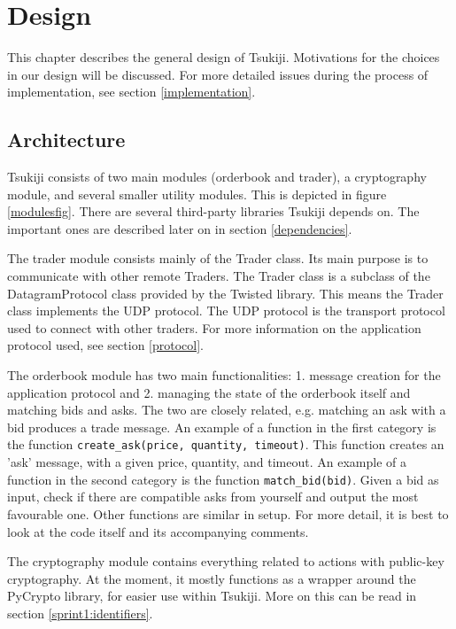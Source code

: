 \section{Design}
This chapter describes the general design of Tsukiji.
Motivations for the choices in our design will be discussed.
For more detailed issues during the process of implementation, see section \ref{implementation}.

\subsection{Architecture}
Tsukiji consists of two main modules (orderbook and trader), a cryptography module, and several smaller utility modules.
This is depicted in figure \ref{modulesfig}.
There are several third-party libraries Tsukiji depends on.
The important ones are described later on in section \ref{dependencies}.

The trader module consists mainly of the Trader class.
Its main purpose is to communicate with other remote Traders.
The Trader class is a subclass of the DatagramProtocol class provided by the Twisted library.
This means the Trader class implements the UDP protocol.
The UDP protocol is the transport protocol used to connect with other traders.
For more information on the application protocol used, see section \ref{protocol}.

The orderbook module has two main functionalities: 1. message creation for the application protocol and 2. managing the state of the orderbook itself and matching bids and asks.
The two are closely related, e.g. matching an ask with a bid produces a trade message.
An example of a function in the first category is the function \texttt{create\_ask(price, quantity, timeout)}.
This function creates an 'ask' message, with a given price, quantity, and timeout.
An example of a function in the second category is the function \texttt{match\_bid(bid)}.
Given a bid as input, check if there are compatible asks from yourself and output the most favourable one.
Other functions are similar in setup.
For more detail, it is best to look at the code itself and its accompanying comments.

The cryptography module contains everything related to actions with public-key cryptography.
At the moment, it mostly functions as a wrapper around the PyCrypto library, for easier use within Tsukiji.
More on this can be read in section \ref{sprint1:identifiers}.

